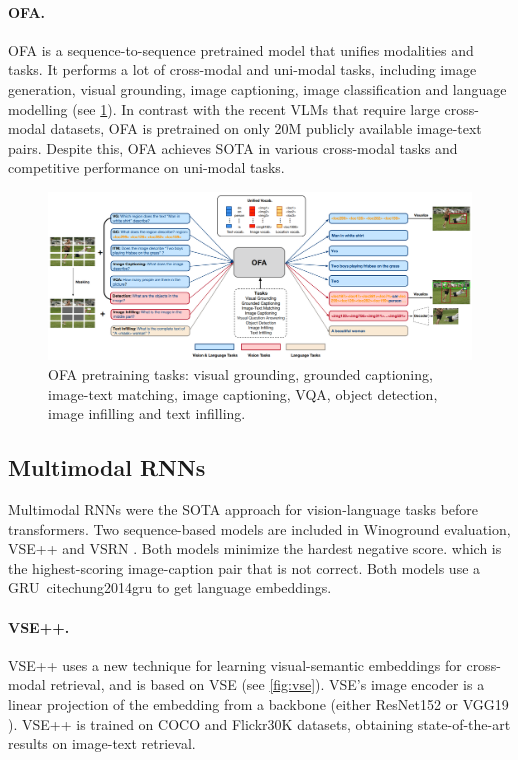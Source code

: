 \paragraph{OFA.} OFA \cite{wang2022unifying} is a sequence-to-sequence pretrained model that unifies modalities and tasks. It performs a lot of cross-modal and uni-modal tasks, including image generation, visual grounding, image captioning, image classification and language modelling (see \cref{fig:ofa}). In contrast with the recent VLMs that require large cross-modal datasets, OFA is pretrained on only 20M publicly available image-text pairs. Despite this, OFA achieves SOTA in various cross-modal tasks and competitive performance on uni-modal tasks.

\begin{figure}[ht]
    \centering
    \includegraphics[width=\linewidth]{images/models/ofa.png}
    \caption{OFA pretraining tasks: visual grounding, grounded captioning, image-text matching, image captioning, VQA, object detection, image infilling and text infilling.}
    \label{fig:ofa}
\end{figure}

\subsection{Multimodal RNNs} \label{sec:multimodal_rnns}

Multimodal RNNs were the SOTA approach for vision-language tasks before transformers. Two sequence-based models are included in Winoground \cite{thrush2022winoground} evaluation, VSE++ \cite{faghri2018vse} and VSRN \cite{li2019vsrn}. Both models minimize the hardest negative score. which is the highest-scoring image-caption pair that is not correct. Both models use a GRU\ cite{chung2014gru} to get language embeddings.

\paragraph{VSE++.} VSE++ \cite{faghri2018vse} uses a new technique for learning visual-semantic embeddings for cross-modal
retrieval, and is based on VSE (see \cref{fig:vse}). VSE's image encoder is a linear projection of the embedding from a backbone (either ResNet152 \cite{he2016deep} or VGG19 \cite{simonyan2015very}). VSE++ is trained on COCO and Flickr30K datasets, obtaining state-of-the-art results on image-text retrieval.

